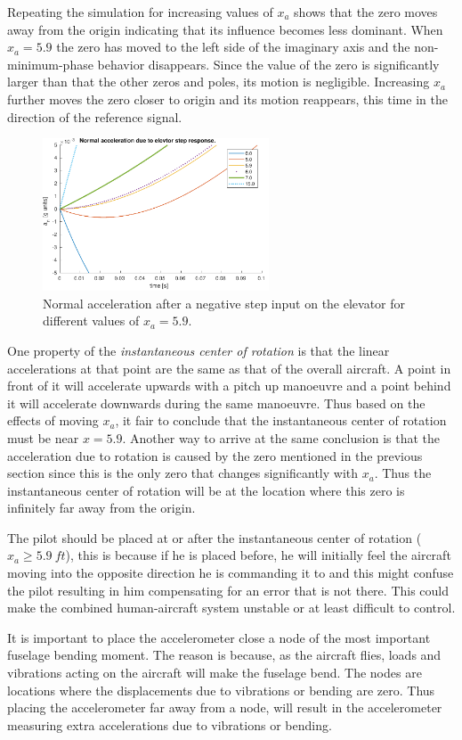 Repeating the simulation for increasing values of $x_a$ shows that the zero moves away from the origin indicating that its influence becomes less dominant. When $x_a=5.9$ the zero has moved to the left side of the imaginary axis and the non-minimum-phase behavior disappears. Since the value of the zero is significantly larger than that the other zeros and poles, its motion is negligible. Increasing $x_a$ further moves the zero closer to origin and its motion reappears, this time in the direction of the reference signal.

\begin{figure}[ht]
    \centering
    \includegraphics[width=0.6\textwidth]{figures/an_elev_step_mult}
    \caption{Normal acceleration after a negative step input on the elevator for different values of $x_a=5.9$.}
    \label{fig:an_elev_step_mult}
\end{figure}

One property of the \emph{instantaneous center of rotation} is that the linear accelerations at that point are the same as that of the overall aircraft. A point in front of it will accelerate upwards with a pitch up manoeuvre and a point behind it will accelerate downwards during the same manoeuvre. Thus based on the effects of moving $x_a$, it fair to conclude that the instantaneous center of rotation must be near $x=5.9$. Another way to arrive at the same conclusion is that the acceleration due to rotation is caused by the zero mentioned in the previous section since this is the only zero that changes significantly with $x_a$. Thus the instantaneous center of rotation will be at the location where this zero is infinitely far away from the origin.

The pilot should be placed at or after the instantaneous center of rotation ($x_a\geq5.9\ ft$), this is because if he is placed before, he will initially feel the aircraft moving into the opposite direction he is commanding it to and this might confuse the pilot resulting in him compensating for an error that is not there. This could make the combined human-aircraft system unstable or at least difficult to control.

It is important to place the accelerometer close a node of the most important fuselage bending moment. The reason is because, as the aircraft flies, loads and vibrations acting on the aircraft will make the fuselage bend. The nodes are locations where the displacements due to vibrations or bending are zero. Thus placing the accelerometer far away from a node, will result in the accelerometer measuring extra accelerations due to vibrations or bending. 
